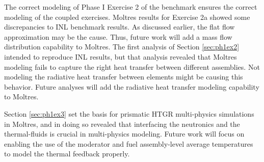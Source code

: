 The correct modeling of Phase I Exercise 2 of the benchmark ensures the correct modeling of the coupled exercises.
Moltres results for Exercise 2a showed some discrepancies to INL benchmark results.
As discussed earlier, the flat flow approximation may be the cause.
Thus, future work will add a mass flow distribution capability to Moltres.
The first analysis of Section \ref{sec:ph1ex2} intended to reproduce INL results, but that analysis revealed that Moltres modeling fails to capture the right heat transfer between different assemblies.
Not modeling the radiative heat transfer between elements might be causing this behavior.
Future analyses will add the radiative heat transfer modeling capability to Moltres.

Section \ref{sec:ph1ex3} set the basis for prismatic HTGR multi-physics simulations in Moltres, and in doing so revealed that interfacing the neutronics and the thermal-fluids is crucial in multi-physics modeling.
Future work will focus on enabling the use of the moderator and fuel assembly-level average temperatures to model the thermal feedback properly.



